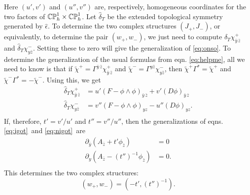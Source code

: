 Here $(u',v')$ and $(u'',v'')$ are, respectively, homogeneous
coordinates for the two factors of $\Bbb{CP}^1_h\times
\Bbb{CP}^1_h$.  Let $\hat\delta_T$ be the extended topological
symmetry generated by $\hat \epsilon$.  To determine the two
complex structures $(J_+,J_-)$, or equivalently, to determine the
pair $(w_+,w_-)$, we just need to compute
$\hat\delta_T\chi^+_{\bar y\,\bar z}$ and
$\hat\delta_T\chi^-_{y\bar z}$. Setting these to zero will give
the generalization of \eqref{eq:onso}. To determine the generalization of
the usual formulas from eqn. \eqref{eq:helpme}, all we need to know is that
if $\tilde\chi^+=\Gamma^{\bar y\,\bar z}\chi^+_{\bar y\,\bar z}$
and $\tilde\chi^-=\Gamma^{y\bar z}\chi^-_{y\bar z}$, then
$\tilde\chi^+\Gamma^*=\tilde\chi^+$  and
$\tilde\chi^-\Gamma^*=-\tilde\chi^-$. Using this, we get
\setcounter{equation}{17}
\begin{equation}\label{eq:qengo}
\begin{aligned}\hat\delta_T\chi^+_{\bar y\,\bar
z}&=u'(F-\phi\wedge\phi)_{\bar y\,\bar z}+v'(D\phi)_{\bar y\,\bar
z}\\ \hat\delta_T\chi^-_{ y \bar z}&=v''(F-\phi\wedge\phi)_{y
z}-u''(D\phi)_{yz}.\\\end{aligned}
\end{equation}
 If, therefore, $t'=v'/u'$ and
$t''=v''/u''$, then the generalizations of eqns. \eqref{eq:igot}\ and
\eqref{eq:nigot}\ are %
\setcounter{equation}{18}
\begin{equation}\label{eq:pokodo}
\begin{aligned}\partial_{\bar y}(A_{\bar
z}+t'\phi_{\bar z})&=0\\ \partial_y(A_{\bar
z}-(t'')^{-1}\phi_{\bar z})&=0 .\\\end{aligned}
\end{equation}
 This determines the two
complex structures: %
\setcounter{equation}{19}
\begin{equation}\label{eq:plombob}
(w_+,w_-)=(-t',(t'')^{-1}).
\end{equation}

